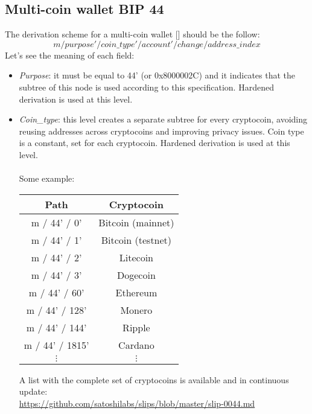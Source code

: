 \subsection{Multi-coin wallet BIP 44}
The derivation scheme for a multi-coin wallet [\cite{5}] should be the follow:
\begin{equation*}
m / purpose' / coin\_type' / account' / change / address\_index
\end{equation*}
Let's see the meaning of each field:
\begin{itemize}
	\item \textit{Purpose}: it must be equal to 44' (or 0x8000002C)  and it indicates that the subtree of this node is used according to this specification. Hardened derivation is used at this level.
	\item \textit{Coin\_type}: this level creates a separate subtree for every cryptocoin, avoiding reusing addresses across cryptocoins and improving privacy issues. Coin type is a constant, set for each cryptocoin. Hardened derivation is used at this level.
	\\ \\
	Some example:
	\begin{center}
		\begin{tabular}{|| c | c ||} 
			\hline
			Path & Cryptocoin  \\ [0.5ex] 
			\hline\hline
			m / 44' / 0' & Bitcoin (mainnet) \\ 
			m / 44' / 1' & Bitcoin (testnet) \\			
			m / 44' / 2' & Litecoin \\			
			m / 44' / 3' & Dogecoin \\			
			m / 44' / 60' & Ethereum  \\ 
			m / 44' / 128' & Monero  \\
			m / 44' / 144' & Ripple  \\ 
			m / 44' / 1815' & Cardano  \\  
			$\vdots $& $\vdots $  \\ 
			\hline
		\end{tabular}
	\end{center}
	A list with the complete set of cryptocoins is available and in continuous update: \\ \url{https://github.com/satoshilabs/slips/blob/master/slip-0044.md }
	

\end{itemize}
